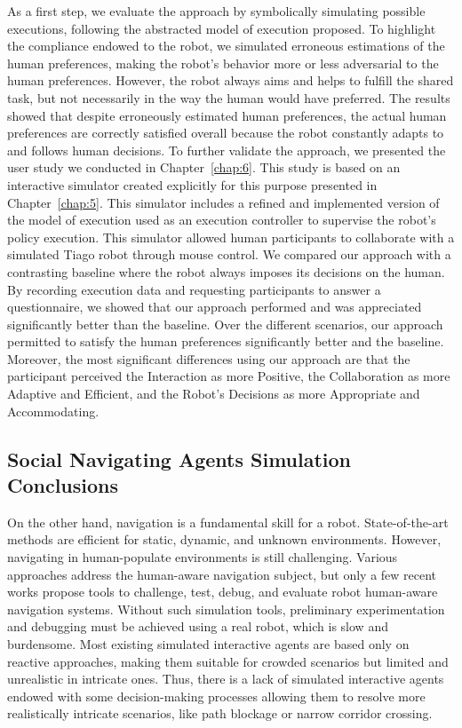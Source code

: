 As a first step, we evaluate the approach by symbolically simulating possible executions, following the abstracted model of execution proposed. To highlight the compliance endowed to the robot, we simulated erroneous estimations of the human preferences, making the robot's behavior more or less adversarial to the human preferences. However, the robot always aims and helps to fulfill the shared task, but not necessarily in the way the human would have preferred. The results showed that despite erroneously estimated human preferences, the actual human preferences are correctly satisfied overall because the robot constantly adapts to and follows human decisions. 
To further validate the approach, we presented the user study we conducted in Chapter~\ref{chap:6}. This study is based on an interactive simulator created explicitly for this purpose presented in Chapter~\ref{chap:5}. This simulator includes a refined and implemented version of the model of execution used as an execution controller to supervise the robot's policy execution. This simulator allowed human participants to collaborate with a simulated Tiago robot through mouse control. We compared our approach with a contrasting baseline where the robot always imposes its decisions on the human. By recording execution data and requesting participants to answer a questionnaire, we showed that our approach performed and was appreciated significantly better than the baseline. Over the different scenarios, our approach permitted to satisfy the human preferences significantly better and the baseline. 
Moreover, the most significant differences using our approach are that the participant perceived the Interaction as more Positive, the Collaboration as more Adaptive and Efficient, and the Robot's Decisions as more Appropriate and Accommodating.    

\subsection*{Social Navigating Agents Simulation Conclusions}

On the other hand, navigation is a fundamental skill for a robot. State-of-the-art methods are efficient for static, dynamic, and unknown environments. However, navigating in human-populate environments is still challenging. Various approaches address the human-aware navigation subject, but only a few recent works propose tools to challenge, test, debug, and evaluate robot human-aware navigation systems. Without such simulation tools, preliminary experimentation and debugging must be achieved using a real robot, which is slow and burdensome. 
Most existing simulated interactive agents are based only on reactive approaches, making them suitable for crowded scenarios but limited and unrealistic in intricate ones. 
Thus, there is a lack of simulated interactive agents endowed with some decision-making processes allowing them to resolve more realistically intricate scenarios, like path blockage or narrow corridor crossing.

